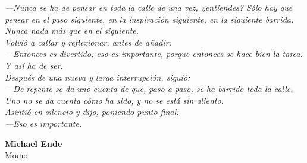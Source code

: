 \textit{ 
—Nunca se ha de pensar en toda la calle de una vez, ¿entiendes? Sólo hay que pensar en el paso siguiente, en la inspiración siguiente, en la siguiente barrida. Nunca nada más que en el siguiente.} \\

\textit{ 
Volvió a callar y reflexionar, antes de añadir:} \\

\textit{ 
—Entonces es divertido; eso es importante, porque entonces se hace bien la tarea. Y así ha de ser.} \\

\textit{ 
Después de una nueva y larga interrupción, siguió:}\\

\textit{ 
—De repente se da uno cuenta de que, paso a paso, se ha barrido toda la calle. Uno no se da cuenta cómo ha sido, y no se está sin aliento.}\\

\textit{ 
Asintió en silencio y dijo, poniendo punto final:}\\

\textit{ 
—Eso es importante.}

\null\hfill \textbf{Michael Ende}\\
\null\hfill Momo

\endgroup
\vspace*{\fill}